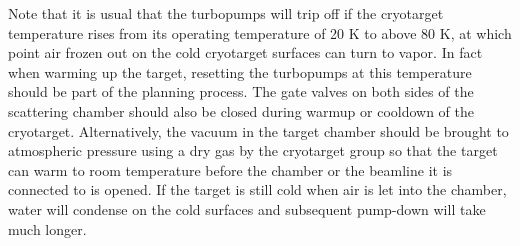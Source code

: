 
Note that it is usual that the turbopumps will trip off if the cryotarget temperature rises from its operating temperature of 20 K to above 80 K, at which point air frozen out on the cold cryotarget surfaces can turn to vapor. In fact when warming up the target, resetting the turbopumps at this temperature should be part of the planning process. The gate valves on both sides of the scattering chamber should also be closed during warmup or cooldown of the cryotarget. Alternatively, the vacuum in the target chamber should be brought to atmospheric pressure using a dry gas by the cryotarget group so that the target can warm to room temperature before the chamber or the beamline it is connected to is opened. If the target is still cold when air is let into the chamber, water will condense on the cold surfaces and subsequent pump-down will take much longer.

